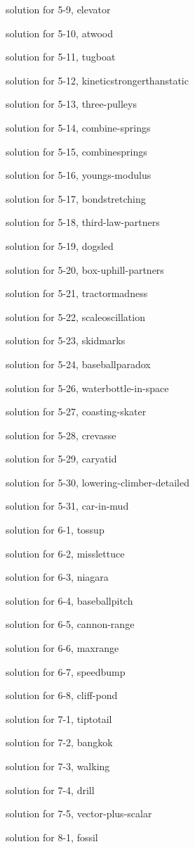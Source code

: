 \documentclass{problems}
\begin{document}
solution for 5-9, elevator

solution for 5-10, atwood

solution for 5-11, tugboat

solution for 5-12, kineticstrongerthanstatic

solution for 5-13, three-pulleys

solution for 5-14, combine-springs

solution for 5-15, combinesprings

solution for 5-16, youngs-modulus

solution for 5-17, bondstretching

solution for 5-18, third-law-partners

solution for 5-19, dogsled

solution for 5-20, box-uphill-partners

solution for 5-21, tractormadness

solution for 5-22, scaleoscillation

solution for 5-23, skidmarks

solution for 5-24, baseballparadox

solution for 5-26, waterbottle-in-space

solution for 5-27, coasting-skater

solution for 5-28, crevasse

solution for 5-29, caryatid

solution for 5-30, lowering-climber-detailed

solution for 5-31, car-in-mud

solution for 6-1, tossup

solution for 6-2, misslettuce

solution for 6-3, niagara

solution for 6-4, baseballpitch

solution for 6-5, cannon-range

solution for 6-6, maxrange

solution for 6-7, speedbump

solution for 6-8, cliff-pond

solution for 7-1, tiptotail

solution for 7-2, bangkok

solution for 7-3, walking

solution for 7-4, drill

solution for 7-5, vector-plus-scalar

solution for 8-1, fossil
\end{document}
